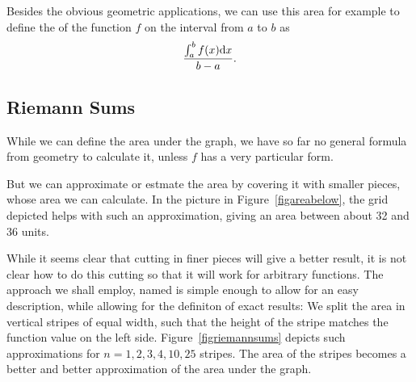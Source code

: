 Besides the obvious geometric applications, we can use this area for example to define the  of the function $f$ on the
interval from $a$ to $b$ as
\[
\frac{\int_a^b f(x){\mbox{d}}x}{b-a}.
\]

\subsection{Riemann Sums}

While we can define the area under the graph, we have so far no general
formula from geometry to calculate it, unless $f$ has a very particular
form.

But we can approximate or estmate the area by covering it with smaller
pieces, whose area we can calculate. In the picture in
Figure~\ref{figareabelow}, the grid depicted helps with such an
approximation, giving an area between about 32 and 36 units.

While it seems clear that cutting in finer pieces will give a better result,
it is not clear how to do this cutting so that it will work for arbitrary
functions. The approach we shall employ, named  is
simple enough to allow for an easy description, while allowing for the
definiton of exact results: We split the area in vertical stripes of equal
width, such that the height of the stripe matches the function value on the
left side. Figure~\ref{figriemannsums} depicts such approximations for
$n=1,2,3,4,10,25$ stripes. The area of the stripes becomes a better and
better approximation of the area under the graph.


